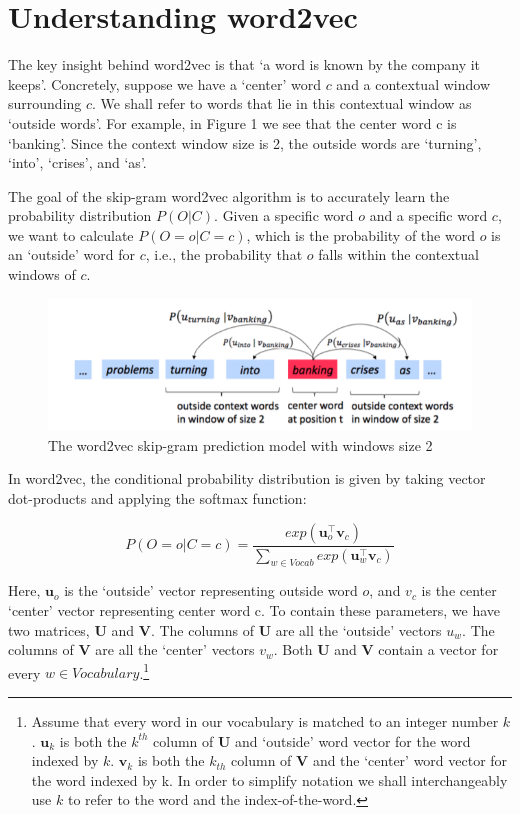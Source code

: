 \documentclass{article}
\begin{document}
	
	\section{Understanding word2vec}
	
	The key insight behind word2vec is that `a word is known by the company it keeps'. Concretely, suppose we have a `center' word $c$ and a contextual window surrounding $c$. We shall refer to words that lie in this contextual window as `outside words'. For example, in Figure 1 we see that the center word c is `banking'. Since the context window size is 2, the outside words are `turning', `into', `crises', and `as'.
	
	The goal of the skip-gram word2vec algorithm is to accurately learn the probability distribution $P(O|C)$. Given a specific word $o$ and a specific word $c$, we want to calculate $P(O=o|C=c)$, which is the probability of the word $o$ is an `outside' word for $c$, i.e., the probability that $o$ falls within the contextual windows of $c$. 
	
	\begin{figure}[h]
		\centering
		\includegraphics[width=0.7\linewidth]{skip-gram}
		\caption{The word2vec skip-gram prediction model with windows size 2}
		\label{fig:skip-gram}
	\end{figure}

	In word2vec, the conditional probability distribution is given by taking vector dot-products and applying the softmax function:
	
	\begin{equation}
		P(O=o|C=c) = \frac{exp(\bm{u}_o^\top \bm{v}_c)}{\sum\limits_{w \in {Vocab}} exp(\bm{u}_w^\top \bm{v}_c)}	
		\label{eq:softmax}
	\end{equation}
	
	Here, $\bm{u}_o$ is the `outside' vector representing outside word $o$, and $v_c$ is the center `center' vector representing center word c. To contain these parameters, we have two matrices, $\bm{U}$ and $\bm{V}$. The columns of $\bm{U}$ are all the `outside' vectors $u_w$. The columns of $\bm{V}$ are all the `center' vectors $v_w$. Both $\bm{U}$ and $\bm{V}$ contain a vector for every $w \in Vocabulary$.\footnote{Assume that every word in our vocabulary is matched to an integer number $k$. $\bm{u}_k$ is both the $k^{th}$ column of $\bm{U}$ and `outside' word vector for the word indexed by $k$. $\bm{v}_k$ is both the $k_{th}$ column of $\bm{V}$ and the `center' word vector for the word indexed by k. In order to simplify notation we shall interchangeably use $k$ to refer to the word and the index-of-the-word.}
	
\end{document}
